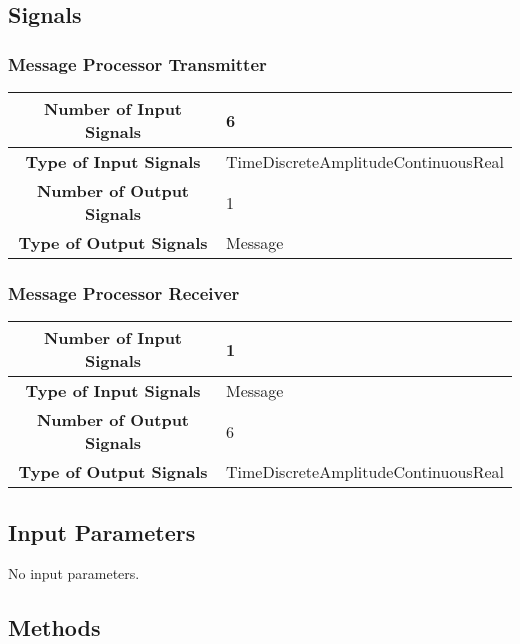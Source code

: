 \subsection*{Signals}

\subsubsection*{Message Processor Transmitter}
\begin{table}[h]
    \centering
	\begin{tabular}{|c|l|}
		\hline
		\textbf{Number of Input Signals} & 6 \\ \hline
        \textbf{Type of Input Signals} & TimeDiscreteAmplitudeContinuousReal \\ \hline
    	\textbf{Number of Output Signals} & 1 \ \\ \hline
        \textbf{Type of Output Signals} & Message \\ \hline
    \end{tabular}
    \label{table:mpt_signals}
\end{table}

\subsubsection*{Message Processor Receiver}
\begin{table}[h]
    \centering
    \begin{tabular}{|c|l|}
        \hline
         \textbf{Number of Input Signals} & 1 \\ \hline
        \textbf{Type of Input Signals} & Message \\ \hline
        \textbf{Number of Output Signals} & 6 \ \\ \hline
        \textbf{Type of Output Signals} & TimeDiscreteAmplitudeContinuousReal \\ \hline
    \end{tabular}
    \label{table:mpr_signals}
\end{table}

\subsection*{Input Parameters}

No input parameters.

\subsection*{Methods}

